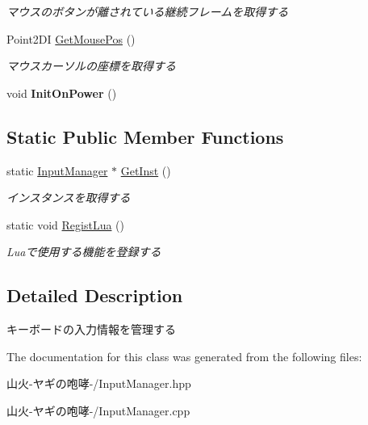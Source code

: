 \begin{DoxyCompactItemize}
\begin{DoxyCompactList}\small\item\em マウスのボタンが離されている継続フレームを取得する \end{DoxyCompactList}\item 
Point2\+DI \hyperlink{class_input_manager_a0866591eebc6a5838433be4782cdac3d}{Get\+Mouse\+Pos} ()\hypertarget{class_input_manager_a0866591eebc6a5838433be4782cdac3d}{}\label{class_input_manager_a0866591eebc6a5838433be4782cdac3d}

\begin{DoxyCompactList}\small\item\em マウスカーソルの座標を取得する \end{DoxyCompactList}\item 
void {\bfseries Init\+On\+Power} ()\hypertarget{class_input_manager_ae50dda5e0e8f33f7a40665551eb6637f}{}\label{class_input_manager_ae50dda5e0e8f33f7a40665551eb6637f}

\end{DoxyCompactItemize}
\subsection*{Static Public Member Functions}
\begin{DoxyCompactItemize}
\item 
static \hyperlink{class_input_manager}{Input\+Manager} $\ast$ \hyperlink{class_input_manager_ae7f3e9db7e5a4d157930a717512f5c2e}{Get\+Inst} ()\hypertarget{class_input_manager_ae7f3e9db7e5a4d157930a717512f5c2e}{}\label{class_input_manager_ae7f3e9db7e5a4d157930a717512f5c2e}

\begin{DoxyCompactList}\small\item\em インスタンスを取得する \end{DoxyCompactList}\item 
static void \hyperlink{class_input_manager_a92b6a2082bdb95b5daf23b24aedfb0f6}{Regist\+Lua} ()\hypertarget{class_input_manager_a92b6a2082bdb95b5daf23b24aedfb0f6}{}\label{class_input_manager_a92b6a2082bdb95b5daf23b24aedfb0f6}

\begin{DoxyCompactList}\small\item\em Luaで使用する機能を登録する \end{DoxyCompactList}\end{DoxyCompactItemize}


\subsection{Detailed Description}
キーボードの入力情報を管理する 

The documentation for this class was generated from the following files\+:\begin{DoxyCompactItemize}
\item 
山火-\/ヤギの咆哮-\//Input\+Manager.\+hpp\item 
山火-\/ヤギの咆哮-\//Input\+Manager.\+cpp\end{DoxyCompactItemize}
